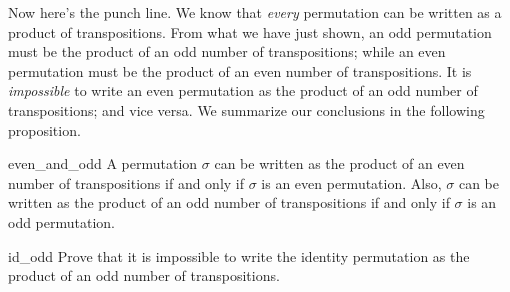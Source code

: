 Now here's the punch line. We know that \emph{every} permutation can be written as a product of transpositions. 
From what we have just shown, an odd permutation must be the product of an odd number of transpositions; while an even permutation must be the product of an even number of transpositions. It is \emph{impossible} to write an even permutation as the product of an odd number of transpositions; and vice versa. 
We summarize our conclusions in the following proposition.

\begin{prop}{even_and_odd}
A permutation $\sigma$ can be written as the product of an even number of transpositions if and only if $\sigma$ is an even permutation. 
Also, $\sigma$ can be written as the product of an odd number of transpositions if and only if $\sigma$ is an odd permutation. 
\end{prop}


\begin{exercise}{id_odd}
Prove that it is impossible to write the identity permutation as the product of an odd number of transpositions.
\end{exercise}



